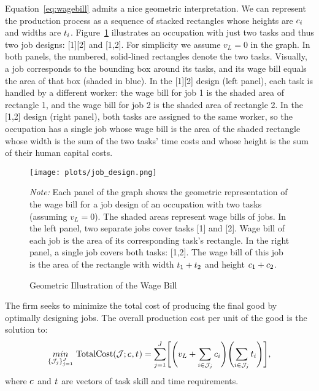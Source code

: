 \documentclass{article}
\theoremstyle{plain}
\theoremstyle{plain}
\begin{document}
Equation~\ref{eq:wagebill} admits a nice geometric interpretation.  
We can represent the production process as a sequence of stacked rectangles whose heights are $c_{i}$ and widths are $t_{i}$.  
Figure~\ref{fig:wage_bill} illustrates an occupation with just two tasks and thus two job designs: [1][2] and [1,2].
For simplicity we assume $v_L=0$ in the graph.
In both panels, the numbered, solid‐lined rectangles denote the two tasks.
Visually, a job corresponds to the bounding box around its tasks, and its wage bill equals the area of that box (shaded in blue).
In the [1][2] design (left panel), each task is handled by a different worker: the wage bill for job 1 is the shaded area of rectangle 1, and the wage bill for job 2 is the shaded area of rectangle 2.  
In the [1,2] design (right panel), both tasks are assigned to the same worker, so the occupation has a single job whose wage bill is the area of the shaded rectangle whose width is the sum of the two tasks’ time costs and whose height is the sum of their human capital costs.  
\begin{figure}[h!]
  \caption{Geometric Illustration of the Wage Bill} 
  \label{fig:wage_bill}
  \begin{center}
    \texttt{[image: plots/job\_design.png]}
  \end{center}
  \begin{footnotesize}
    \emph{Note:} Each panel of the graph shows the geometric representation of the wage bill for a job design of an occupation with two tasks (assuming $v_L=0$).  
    The shaded areas represent wage bills of jobs. 
    In the left panel, two separate jobs cover tasks [1] and [2].
    Wage bill of each job is the area of its corresponding task's rectangle.
    In the right panel, a single job covers both tasks: [1,2].
    The wage bill of this job is the area of the rectangle with width $t_{1}+t_{2}$ and height $c_{1}+c_{2}$.
  \end{footnotesize}
\end{figure}

The firm seeks to minimize the total cost of producing the final good by optimally designing jobs.
The overall production cost per unit of the good is the solution to:
\begin{align}
\label{eq:totalcost_no_handoff}
\underset{\{\J_j\}_{j=1}^J}{min} \ 
\text{TotalCost}(\J; \hccost{}, \timecost{})
= 
\sum_{j=1}^J \Biggl[\Biggl(v_L + \sum_{i \in \J_j} \hccost{i} \Biggr) \Biggl(\sum_{i \in \J_j} \timecost{i} \Biggr)\Biggr],
\end{align}
where $c_{}$ and $t_{}$ are vectors of task skill and time requirements. 
\end{document}
